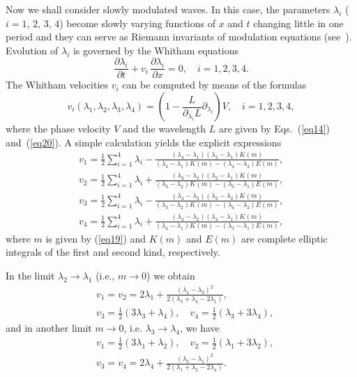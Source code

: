 \documentclass[pre,aps,superscriptaddress,twocolumn,floatfix]{revtex4-1}
\newcommand{\prt}{\partial}
\newcommand{\la}{\lambda}
\begin{document}
Now we shall consider slowly modulated waves. In
this case, the parameters $\la_i$ ($i = 1$, $2$, $3$, $4$) become slowly
varying functions of $x$ and $t$ changing little in one period
and they can serve as Riemann invariants of modulation equations 
(see~\cite{Kamchatnov-2000}). Evolution of $\la_i$
is governed by the Whitham equations
\begin{equation}\label{eq26}
\frac{\prt\la_i}{\prt t}+v_i\, \frac{\prt\la_i}{\prt x}=0,
\quad i=1,2,3,4.
\end{equation}
The  Whitham velocities $v_i$ can be computed by means of the formulas
\begin{equation}\label{eq27}
v_i(\la_1,\la_2,\la_3,\la_4)
=\left(1-\frac{L}{\partial_{\lambda_i}L}\prt_{\lambda_i}\right)V,
\quad i=1,2,3,4,
\end{equation}
where the phase velocity $V$ and the wavelength $L$ are given
by Eqs.~(\ref{eq14}) and~(\ref{eq20}). A simple
calculation yields the explicit expressions
\begin{equation}\label{eq28}
\begin{array}{l}
\displaystyle{
	v_1=\frac12\sum_{i=1}^4\la_i-\frac{(\la_4-\la_1)(\la_2-\la_1)K(m)}
	{(\la_4-\la_1)K(m)-(\la_4-\la_2)E(m)},}\\[5mm]
\displaystyle{
	v_2=\frac12\sum_{i=1}^4\la_i+\frac{(\la_3-\la_2)(\la_2-\la_1)K(m)}
	{(\la_3-\la_2)K(m)-(\la_3-\la_1)E(m)},}\\[5mm]
\displaystyle{
	v_3=\frac12\sum_{i=1}^4\la_i-\frac{(\la_4-\la_3)(\la_3-\la_2)K(m)}
	{(\la_3-\la_2)K(m)-(\la_4-\la_2)E(m)},}\\[5mm]
\displaystyle{
	v_4=\frac12\sum_{i=1}^4\la_i+\frac{(\la_4-\la_2)(\la_4-\la_1)K(m)}
	{(\la_4-\la_1)K(m)-(\la_3-\la_1)E(m)},}
\end{array}
\end{equation}
where $m$ is given by (\ref{eq19}) and
$K(m)$ and $E(m)$ are complete elliptic integrals of
the first and second kind, respectively.

In the limit $\la_2\to\la_1$ (i.e.,
$m\to0$) we obtain
\begin{equation}\label{eq30}
\begin{split}
& v_1=v_2=2\la_1+\frac{(\la_4-\la_3)^2}{2(\la_3+\la_4-2\la_1)},\\
& v_3=\frac12(3\la_3+\la_4),\quad v_4=\frac12(\la_3+3\la_4),
\end{split}
\end{equation}
and in another limit $m\to0$, i.e. $\la_3\to\la_4$, we have
\begin{equation}\label{eq31}
\begin{split}
&    v_1=\frac12(3\la_1+\la_2),\quad v_2=\frac12(\la_1+3\la_2),\\
&    v_3=v_4=2\la_4+\frac{(\la_2-\la_1)^2}{2(\la_1+\la_2-2\la_4)}.
\end{split}
\end{equation}
\end{document}

